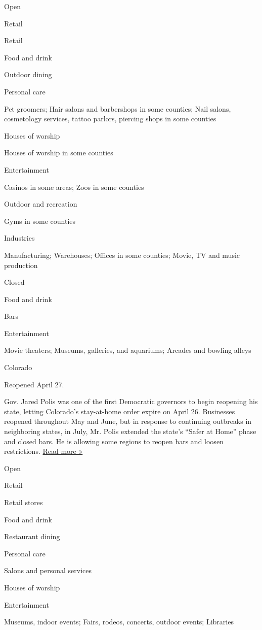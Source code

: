 Open

Retail

Retail

Food and drink

Outdoor dining

Personal care

Pet groomers; Hair salons and barbershops in some counties; Nail salons,
cosmetology services, tattoo parlors, piercing shops in some counties

Houses of worship

Houses of worship in some counties

Entertainment

Casinos in some areas; Zoos in some counties

Outdoor and recreation

Gyms in some counties

Industries

Manufacturing; Warehouses; Offices in some counties; Movie, TV and music
production

Closed

Food and drink

Bars

Entertainment

Movie theaters; Museums, galleries, and aquariums; Arcades and bowling
alleys

Colorado

Reopened April 27.

Gov. Jared Polis was one of the first Democratic governors to begin
reopening his state, letting Colorado's stay-at-home order expire on
April 26. Businesses reopened throughout May and June, but in response
to continuing outbreaks in neighboring states, in July, Mr. Polis
extended the state's ``Safer at Home'' phase and closed bars. He is
allowing some regions to reopen bars and loosen restrictions.
\href{https://denver.cbslocal.com/2020/06/30/polis-colorado-bars-coronavirus/}{Read
more »}

Open

Retail

Retail stores

Food and drink

Restaurant dining

Personal care

Salons and personal services

Houses of worship

Entertainment

Museums, indoor events; Fairs, rodeos, concerts, outdoor events;
Libraries

